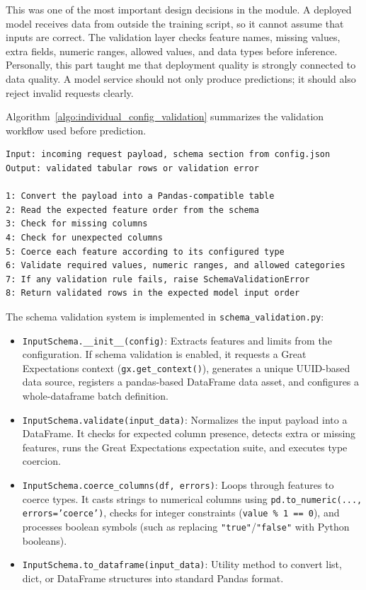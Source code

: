\documentclass[12pt,a4paper,oneside]{report}
\newcommand{\modulepath}[1]{\texttt{#1}}
\begin{document}
This was one of the most important design decisions in the module. A deployed model receives data from outside the training script, so it cannot assume that inputs are correct. The validation layer checks feature names, missing values, extra fields, numeric ranges, allowed values, and data types before inference. Personally, this part taught me that deployment quality is strongly connected to data quality. A model service should not only produce predictions; it should also reject invalid requests clearly.

Algorithm~\ref{algo:individual_config_validation} summarizes the validation workflow used before prediction.

\begin{lstlisting}[style=algostyle,caption={Deployment Configuration and Request Validation},label={algo:individual_config_validation}]
Input: incoming request payload, schema section from config.json
Output: validated tabular rows or validation error

1: Convert the payload into a Pandas-compatible table
2: Read the expected feature order from the schema
3: Check for missing columns
4: Check for unexpected columns
5: Coerce each feature according to its configured type
6: Validate required values, numeric ranges, and allowed categories
7: If any validation rule fails, raise SchemaValidationError
8: Return validated rows in the expected model input order
\end{lstlisting}

\noindent The schema validation system is implemented in \modulepath{schema\_validation.py}:
\begin{itemize}[leftmargin=*]
  \item \texttt{InputSchema.\_\_init\_\_(config)}: Extracts features and limits from the configuration. If schema validation is enabled, it requests a Great Expectations context (\texttt{gx.get\_context()}), generates a unique UUID-based data source, registers a pandas-based DataFrame data asset, and configures a whole-dataframe batch definition.
  \item \texttt{InputSchema.validate(input\_data)}: Normalizes the input payload into a DataFrame. It checks for expected column presence, detects extra or missing features, runs the Great Expectations expectation suite, and executes type coercion.
  \item \texttt{InputSchema.coerce\_columns(df, errors)}: Loops through features to coerce types. It casts strings to numerical columns using \texttt{pd.to\_numeric(..., errors='coerce')}, checks for integer constraints (\texttt{value \% 1 == 0}), and processes boolean symbols (such as replacing \texttt{"true"}/\texttt{"false"} with Python booleans).
  \item \texttt{InputSchema.to\_dataframe(input\_data)}: Utility method to convert list, dict, or DataFrame structures into standard Pandas format.
\end{itemize}
\end{document}
